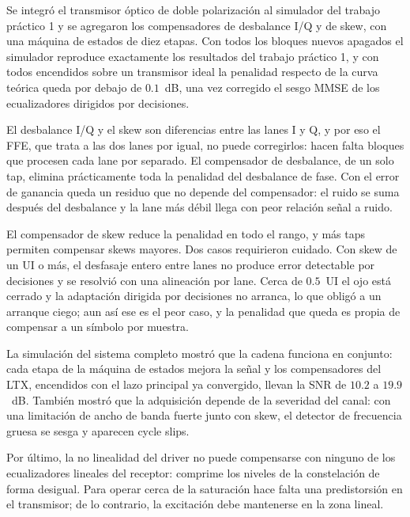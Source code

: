 Se integró el transmisor óptico de doble polarización al simulador del
trabajo práctico 1 y se agregaron los compensadores de desbalance I/Q y de
skew, con una máquina de estados de diez etapas. Con todos los bloques
nuevos apagados el simulador reproduce exactamente los resultados del
trabajo práctico 1, y con todos encendidos sobre un transmisor ideal la
penalidad respecto de la curva teórica queda por debajo de $0.1$~dB, una
vez corregido el sesgo MMSE de los ecualizadores dirigidos por decisiones.

El desbalance I/Q y el skew son diferencias entre las lanes I y Q, y por
eso el FFE, que trata a las dos lanes por igual, no puede corregirlos:
hacen falta bloques que procesen cada lane por separado. El compensador de
desbalance, de un solo tap, elimina prácticamente toda la penalidad del
desbalance de fase. Con el error de ganancia queda un residuo que no
depende del compensador: el ruido se suma después del desbalance y la lane
más débil llega con peor relación señal a ruido.

El compensador de skew reduce la penalidad en todo el rango, y más taps
permiten compensar skews mayores. Dos casos requirieron cuidado. Con
skew de un UI o más, el desfasaje entero entre lanes no produce error
detectable por decisiones y se resolvió con una alineación por lane. Cerca
de $0.5$~UI el ojo está cerrado y la adaptación dirigida por decisiones no
arranca, lo que obligó a un arranque ciego; aun así ese es el peor caso,
y la penalidad que queda es propia de compensar a un símbolo por muestra.

La simulación del sistema completo mostró que la cadena funciona en
conjunto: cada etapa de la máquina de estados mejora la señal y los
compensadores del LTX, encendidos con el lazo principal ya convergido,
llevan la SNR de $10.2$ a $19.9$~dB. También mostró que la adquisición
depende de la severidad del canal: con una limitación de ancho de banda
fuerte junto con skew, el detector de frecuencia gruesa se sesga y
aparecen cycle slips.

Por último, la no linealidad del driver no puede compensarse con ninguno
de los ecualizadores lineales del receptor: comprime los niveles de la
constelación de forma desigual. Para operar cerca de la saturación hace
falta una predistorsión en el transmisor; de lo contrario, la excitación
debe mantenerse en la zona lineal.
